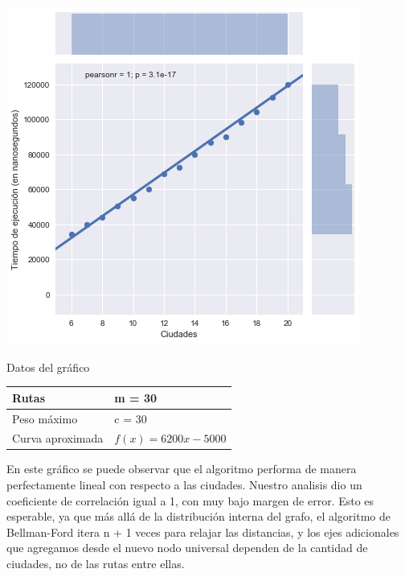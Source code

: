 \noindent
\begin{minipage}{0.55\textwidth}
	\hfill
	\includegraphics[scale=0.6]{imagenes/ej2-1.png}
\end{minipage}
\hfill
\begin{minipage}{0.42\textwidth}
	\begin{center}
		Datos del gráfico

		\begin{tabular}{ | l l |}
			\hline
			Rutas & m = 30 \\ \hline
			Peso máximo & c = 30 \\ \hline
			Curva aproximada & $f(x) = 6200 x - 5000$ \\
			\hline
		\end{tabular}
	\end{center}
\end{minipage}

En este gráfico se puede observar que el algoritmo performa de manera perfectamente lineal con respecto a las ciudades. Nuestro analisis dio un coeficiente de correlación igual a 1, con muy bajo margen de error. Esto es esperable, ya que más allá de la distribución interna del grafo, el algoritmo de Bellman-Ford itera n + 1 veces para relajar las distancias, y los ejes adicionales que agregamos desde el nuevo nodo universal dependen de la cantidad de ciudades, no de las rutas entre ellas.

